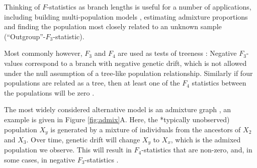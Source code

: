 \documentclass[12pt,fullpage, a4paper]{article}
\begin{document}
Thinking of $F$-statistics as branch lengths is useful for a number of applications, including building multi-population models \citep{patterson2012, lipson2013}, estimating admixture proportions \citep{petr2019, harney2021} and finding the population most closely related to an unknown sample (``Outgroup''-$F_3$-statistic).


Most commonly however, $F_3$ and $F_4$ are used as tests of treeness \citep{patterson2012}: Negative $F_3$-values correspond to a branch with negative genetic drift, which is not allowed under the null assumption of a tree-like population relationship. Similarly if four populations are related as a tree, then at least one of the $F_4$ statistics between the populations will be zero \citep{buneman1974, patterson2012}. 

The most widely considered alternative model is an admixture graph \citep{patterson2012}, an example is given in Figure \ref{fig:admix}A. Here, the *typically unobserved) population $X_y$ is generated by a mixture of individuals from the ancestors of $X_2$ and $X_3$. Over time, genetic drift will change $X_y$ to $X_x$, which is the admixed population we observe. This will result in $F_4$-statistics that are non-zero, and, in some cases, in negative $F_3$-statistics \citep[exact conditions can be found in ][]{peter2016}. 
\end{document}
